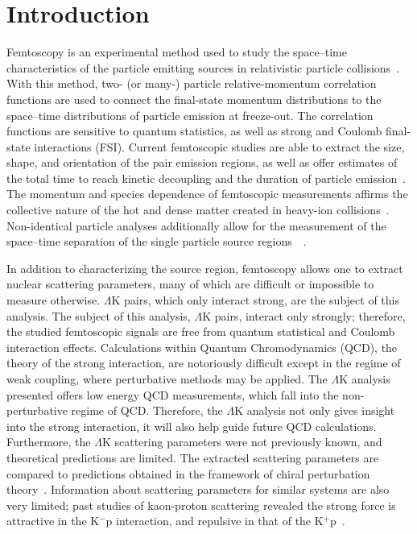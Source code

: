 \documentclass[ALICE,manyauthors]{cernphprep}
\newcommand{\LamK}{$\Lambda$K\xspace}
\begin{document}
\section{Introduction}
\label{sec:Introduction}

Femtoscopy is an experimental method used to study the space--time characteristics of the particle emitting sources in relativistic particle collisions~\cite{Lisa:2005dd, Kopylov:1972qw}.  
With this method, two- (or many-) particle relative-momentum correlation functions are used to connect the final-state momentum distributions to the space--time distributions of particle emission at freeze-out.  
The correlation functions are sensitive to quantum statistics, as well as strong and Coulomb final-state interactions (FSI).  
Current femtoscopic studies are able to extract the size, shape, and orientation of the pair emission regions, as well as offer estimates of the total time to reach kinetic decoupling and the duration of particle emission~\cite{Lisa:2005dd, Lisa:2008gf}.
The momentum and species dependence of femtoscopic measurements affirm{\color{blue}s} the collective nature of the hot and dense matter created in heavy-ion collisions~\cite{Makhlin:1987gm, Akkelin:1995gh, Retiere:2003kf, Kisiel:2009eh}.
Non-identical particle analyses additionally allow for the measurement of the space--time separation of the single particle source regions{\color{red}~\cite{Lednicky:1995vk, Voloshin:1997jh, Lednicky:2001qv, Retiere:2003kf}}{\color{blue}~\cite{Lednicky:1995vk, Voloshin:1997jh, Retiere:2003kf}}.

In addition to characterizing the source region, femtoscopy allows one to extract nuclear scattering parameters, many of which are difficult or impossible to measure otherwise.
{\color{red}\LamK pairs, which only interact strong, are the subject of this analysis.}
{\color{blue}The subject of this analysis, \LamK pairs, interact only strongly; therefore, the studied femtoscopic signals are free from quantum statistical and Coulomb interaction effects.}
Calculations within Quantum Chromodynamics (QCD), the theory of the strong interaction, are notoriously difficult except in the regime of weak coupling, where perturbative methods may be applied. 
The \LamK analysis presented offers low energy QCD measurements, which fall into the non-perturbative regime of QCD.
Therefore, the \LamK analysis not only gives insight into the strong interaction, it will also help guide future QCD calculations.
Furthermore, the \LamK scattering parameters were not previously known, and theoretical predictions are limited.
The extracted scattering parameters are compared to predictions obtained in the framework of chiral perturbation theory~\cite{Liu:2006xja,Mai:2009ce}.
Information about scattering parameters for similar systems are also very limited; past studies of kaon-proton scattering revealed the strong force is attractive in the K$^{-}$p interaction, and repulsive in that of the K$^{+}$p~\cite{Humphrey:1962zz, Hadjimichef:2002xe, Ikeda:2012au}.
\end{document}
